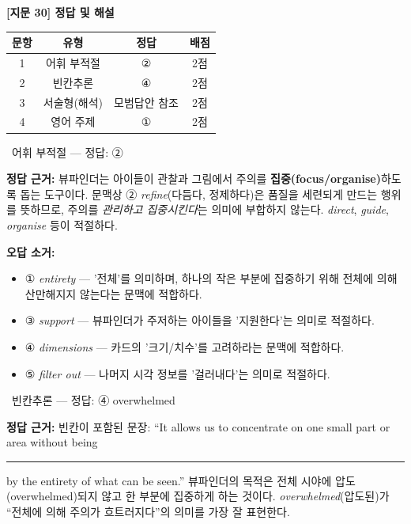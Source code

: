 \documentclass[11pt,a4paper]{article}
\newcommand{\qno}[1]{\par\vspace{10pt}\noindent{\sffamily\bfseries #1.}\ }
\newcommand{\instr}[1]{{\sffamily #1}\par\vspace{3pt}}
\begin{document}
\begin{center}
{\fontsize{15}{17}\selectfont\sffamily\bfseries [지문 30] 정답 및 해설}
\end{center}
\vspace{6pt}

\begin{center}
\begin{tabular}{cccc}
\toprule
문항 & 유형 & 정답 & 배점 \\
\midrule
1 & 어휘 부적절 & ② & 2점 \\
2 & 빈칸추론    & ④ & 2점 \\
3 & 서술형(해석) & 모범답안 참조 & 2점 \\
4 & 영어 주제 & ① & 2점 \\
\bottomrule
\end{tabular}
\end{center}
\vspace{8pt}

\qno{1}\instr{어휘 부적절 — 정답: ②}

\textbf{정답 근거:} 뷰파인더는 아이들이 관찰과 그림에서 주의를 \textbf{집중(focus/organise)}하도록 돕는 도구이다. 문맥상 ② \textit{refine}(다듬다, 정제하다)은 품질을 세련되게 만드는 행위를 뜻하므로, 주의를 \textit{관리하고 집중시킨다}는 의미에 부합하지 않는다. \textit{direct}, \textit{guide}, \textit{organise} 등이 적절하다.

\textbf{오답 소거:}
\begin{itemize}[leftmargin=2em,itemsep=1pt,topsep=2pt]
  \item ① \textit{entirety} — '전체'를 의미하며, 하나의 작은 부분에 집중하기 위해 전체에 의해 산만해지지 않는다는 문맥에 적합하다.
  \item ③ \textit{support} — 뷰파인더가 주저하는 아이들을 '지원한다'는 의미로 적절하다.
  \item ④ \textit{dimensions} — 카드의 '크기/치수'를 고려하라는 문맥에 적합하다.
  \item ⑤ \textit{filter out} — 나머지 시각 정보를 '걸러내다'는 의미로 적절하다.
\end{itemize}

\qno{2}\instr{빈칸추론 — 정답: ④ overwhelmed}

\textbf{정답 근거:} 빈칸이 포함된 문장: ``It allows us to concentrate on one small part or area without being \rule{2cm}{0.4pt} by the entirety of what can be seen.'' 뷰파인더의 목적은 전체 시야에 압도(overwhelmed)되지 않고 한 부분에 집중하게 하는 것이다. \textit{overwhelmed}(압도된)가 ``전체에 의해 주의가 흐트러지다''의 의미를 가장 잘 표현한다.
\end{document}
